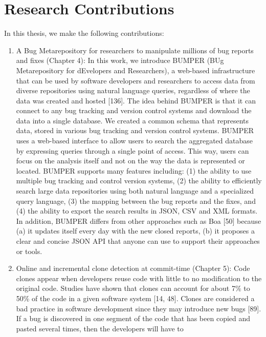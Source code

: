 \documentclass[12pt]{report}
\begin{document}
\section{Research Contributions}\label{research-contributions}

In this thesis, we make the following contributions:

\begin{enumerate}
\def\labelenumi{\arabic{enumi}.}
\item
  A Bug Metarepository for researchers to manipulate millions of bug
  reports and fixes (Chapter 4): In this work, we introduce BUMPER (BUg
  Metarepository for dEvelopers and Researchers), a web-based
  infrastructure that can be used by software developers and researchers
  to access data from diverse repositories using natural language
  queries, regardless of where the data was created and
  hosted {[}136{]}. The idea behind BUMPER is that it can connect to any
  bug tracking and version control systems and download the data into a
  single database. We created a common schema that represents data,
  stored in various bug tracking and version control systems. BUMPER
  uses a web-based interface to allow users to search the aggregated
  database by expressing queries through a single point of access. This
  way, users can focus on the analysis itself and not on the way the
  data is represented or located. BUMPER supports many features
  including: (1) the ability to use multiple bug tracking and control
  version systems, (2) the ability to efficiently search large data
  repositories using both natural language and a specialized query
  language, (3) the mapping between the bug reports and the fixes, and
  (4) the ability to export the search results in JSON, CSV and XML
  formats. In addition, BUMPER differs from other approaches such as Boa
  {[}50{]} because (a) it updates itself every day with the new closed
  reports, (b) it proposes a clear and concise JSON API that anyone can
  use to support their approaches or tools.
\item
  Online and incremental clone detection at commit-time (Chapter 5):
  Code clones appear when developers reuse code with little to no
  modification to the original code. Studies have shown that clones can
  account for about 7\% to 50\% of the code in a given software system
  {[}14, 48{]}. Clones are considered a bad practice in
  software development since they may introduce new bugs
  {[}89{]}. If a bug is discovered in one segment of the code that has
  been copied and pasted several times, then the developers will have to

\end{enumerate}
\end{document}
